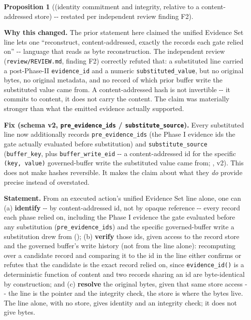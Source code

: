\documentclass[11pt,a4paper]{article}
\theoremstyle{definition}
\newtheorem{proposition}{Proposition}
\begin{document}
\begin{proposition}[(identity commitment and integrity, relative to a content-addressed store) -{}- restated per independent review finding F2]
\label{prop:4}

\noindent\textbf{Why this changed.} The prior statement here claimed the unified Evidence Set line lets one ``reconstruct, content-addressed, exactly the records each gate relied on'' -{}- language that reads as byte reconstruction. The independent review (\texttt{review/REVIEW.md}, finding F2) correctly refuted that: a substituted line carried a post-Phase-II \texttt{evidence\_id} and a numeric \texttt{substituted\_value}, but no original bytes, no original metadata, and no record of which prior buffer write the substituted value came from. A content-addressed hash is not invertible -{}- it commits to content, it does not carry the content. The claim was materially stronger than what the emitted evidence actually supported.

\noindent\textbf{Fix (schema v2, \texttt{pre\_evidence\_ids} / \texttt{substitute\_source}).} Every substituted line now additionally records \texttt{pre\_evidence\_ids} (the Phase I evidence ids the gate actually evaluated before substitution) and \texttt{substitute\_source} (\texttt{buffer\_key}, plus \texttt{buffer\_write\_eid} -{}- a content-addressed id for the specific \texttt{(key, value)} governed-buffer write the substituted value came from; ,  v2). This does not make hashes reversible. It makes the claim about what they \textit{do} provide precise instead of overstated.

\noindent\textbf{Statement.} From an executed action's unified Evidence Set line alone, one can (a) \textbf{identify} -{}- by content-addressed id, not by opaque reference -{}- every record each phase relied on, including the Phase I evidence the gate evaluated before any substitution (\texttt{pre\_evidence\_ids}) and the specific governed-buffer write a substitution drew from (); (b) \textbf{verify} those ids, given access to the record store and the governed buffer's write history (not from the line alone): recomputing  over a candidate record and comparing it to the id in the line either confirms or refutes that the candidate is the exact record relied on, since \texttt{evidence\_id()} is a deterministic function of content and two records sharing an id are byte-identical by construction; and (c) \textbf{resolve} the original bytes, given that same store access -{}- the line is the pointer and the integrity check, the store is where the bytes live. The line alone, with no store, gives identity and an integrity check; it does not give bytes.


\end{proposition}
\end{document}
